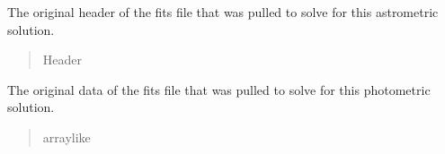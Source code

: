 \documentclass[letterpaper,11pt,english]{sphinxmanual}
\begin{document}
\begin{savenotes}
\begin{fulllineitems}
\begin{savenotes}
\begin{fulllineitems}
\begin{quote}
\begin{description}
\end{description}\end{quote}

\end{fulllineitems}\end{savenotes}


\begin{savenotes}\begin{fulllineitems}
\label{\detokenize{code/opihiexarata.photometry.solution:opihiexarata.photometry.solution.PhotometricSolution._original_header}}
\pysigstartsignatures
{}
\pysigstopsignatures
\sphinxAtStartPar
The original header of the fits file that was pulled to solve for this
astrometric solution.
\begin{quote}\begin{description}
\sphinxAtStartPar
Header

\end{description}\end{quote}

\end{fulllineitems}\end{savenotes}


\begin{savenotes}\begin{fulllineitems}
\label{\detokenize{code/opihiexarata.photometry.solution:opihiexarata.photometry.solution.PhotometricSolution._original_data}}
\pysigstartsignatures
{}
\pysigstopsignatures
\sphinxAtStartPar
The original data of the fits file that was pulled to solve for this
photometric solution.
\begin{quote}\begin{description}
\sphinxAtStartPar
array\sphinxhyphen{}like

\end{description}\end{quote}


\end{fulllineitems}
\end{savenotes}
\end{fulllineitems}
\end{savenotes}
\end{document}
